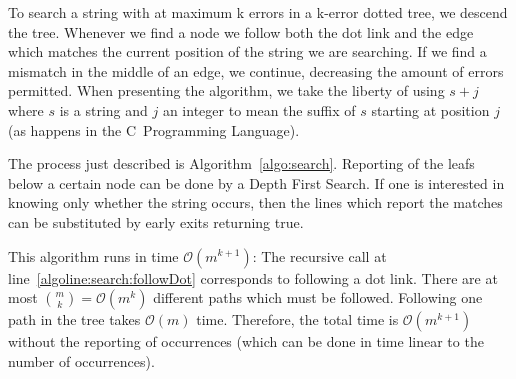 To search a string with at maximum k errors in a k-error dotted tree, we descend the tree. Whenever we find a node we follow both the dot link and the edge which matches the current position of the string we are searching. If we find a mismatch in the middle of an edge, we continue, decreasing the amount of errors permitted.
When presenting the algorithm, we take the liberty of using $s+j$ where $s$ is a string and $j$ an integer to mean the suffix of $s$ starting at position $j$ (as happens in the C~Programming Language).



The process just described is Algorithm~\ref{algo:search}. Reporting of the leafs below a certain node can be done by a Depth First Search. If one is interested in knowing only whether the string occurs, then the lines which report the matches can be substituted by early exits returning true.

This algorithm runs in time $\mathcal{O}(m^{k+1})$: The recursive call at line~\ref{algoline:search:followDot} corresponds to following a dot link. There are at most ${m \choose k}=\mathcal{O}(m^k)$ different paths which must be followed. Following one path in the tree takes $\mathcal{O}(m)$ time. Therefore, the total time is $\mathcal{O}(m^{k+1})$ without the reporting of occurrences (which can be done in time linear to the number of occurrences).
